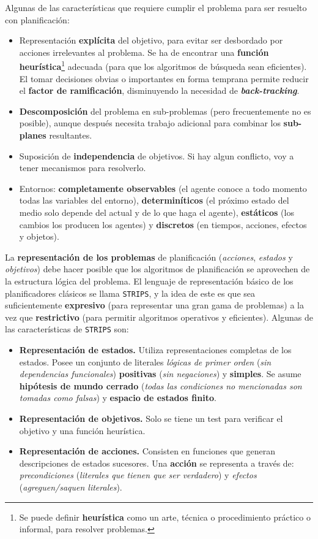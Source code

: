 \documentclass[10pt,a4paper]{article}
\begin{document}
Algunas de las características que requiere cumplir el problema para ser resuelto con planificación:
\begin{itemize}
\item Representación \textbf{explícita} del objetivo, para evitar ser desbordado por acciones irrelevantes al problema. Se ha de encontrar una \textbf{función heurística}\footnote{Se puede definir \textbf{heurística} como un arte, técnica o procedimiento práctico o informal, para resolver problemas.} adecuada (para que los algoritmos de búsqueda sean eficientes). El tomar decisiones obvias o importantes en forma temprana permite reducir el \textbf{factor de ramificación}, disminuyendo la necesidad de \textbf{\textit{back-tracking}}.
\item \textbf{Descomposición} del problema en sub-problemas (pero frecuentemente no es posible), aunque después necesita trabajo adicional para combinar los \textbf{sub-planes} resultantes.
\item Suposición de \textbf{independencia} de objetivos. Si hay algun conflicto, voy a tener mecanismos para resolverlo.
\item Entornos: \textbf{completamente observables} (el agente conoce a todo momento todas las variables del entorno), \textbf{determiníticos} (el próximo estado del medio solo depende del actual y de lo que haga el agente), \textbf{estáticos} (los cambios los producen los agentes) y \textbf{discretos} (en tiempos, acciones, efectos y objetos).
\end{itemize}

La \textbf{representación de los problemas} de planificación (\textit{acciones}, \textit{estados} y \textit{objetivos}) debe hacer posible que los algoritmos de planificación se aprovechen de la estructura lógica del problema. El lenguaje de representación básico de los planificadores clásicos se llama \texttt{STRIPS}, y la idea de este es que sea suficientemente \textbf{expresivo} (para representar una gran gama de problemas) a la vez que \textbf{restrictivo} (para permitir algoritmos operativos y eficientes). Algunas de las características de \texttt{STRIPS} son:
\begin{itemize}
\item \textbf{Representación de estados.} Utiliza representaciones completas de los estados. Posee un conjunto de literales \textit{lógicas de primer orden} (\textit{sin dependencias funcionales}) \textbf{positivas} (\textit{sin negaciones}) y \textbf{simples}. Se asume \textbf{hipótesis de mundo cerrado} (\textit{todas las condiciones no mencionadas son tomadas como falsas}) y \textbf{espacio de estados finito}.
\item \textbf{Representación de objetivos.} Solo se tiene un test para verificar el objetivo y una función heurística.
\item \textbf{Representación de acciones.} Consisten en funciones que generan descripciones de estados sucesores. Una \textbf{acción} se representa a través de: \textit{precondiciones} (\textit{literales que tienen que ser verdadero}) y \textit{efectos} (\textit{agreguen/saquen literales}).
\end{itemize}
\end{document}
